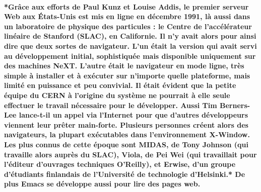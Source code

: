 \paragraph{
  *Grâce aux efforts de Paul Kunz et Louise Addis, le premier serveur Web aux États-Unis est mis en ligne en décembre 1991, là aussi dans un laboratoire de physique des particules : le Centre de l'accélérateur linéaire de Stanford (SLAC), en Californie. Il n'y avait alors pour ainsi dire que deux sortes de navigateur. L'un était la version qui avait servi au développement initial, sophistiquée mais disponible uniquement sur des machines NeXT. L'autre était le navigateur en mode ligne, très simple à installer et à exécuter sur n'importe quelle plateforme, mais limité en puissance et peu convivial. Il était évident que la petite équipe du CERN à l'origine du système ne pourrait à elle seule effectuer le travail nécessaire pour le développer. Aussi Tim Berners-Lee lance-t-il un appel via l'Internet pour que d'autres développeurs viennent leur prêter main-forte. Plusieurs personnes créent alors des navigateurs, la plupart exécutables dans l'environnement X-Window. Les plus connus de cette époque sont MIDAS, de Tony Johnson (qui travaille alors auprès du SLAC), Viola, de Pei Wei (qui travaillait pour l'éditeur d'ouvrages techniques O'Reilly), et Erwise, d'un groupe d'étudiants finlandais de l'Université de technologie d'Helsinki.* De plus Emacs se développe aussi pour lire des pages web.
}
